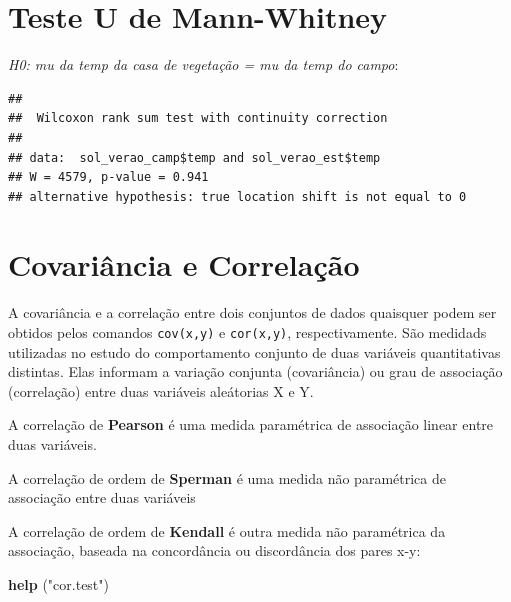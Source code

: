 \documentclass[
]{book}
\newenvironment{Shaded}{\begin{snugshade}}{\end{snugshade}}
\newcommand{\DataTypeTok}[1]{\textcolor[rgb]{0.13,0.29,0.53}{#1}}
\newcommand{\KeywordTok}[1]{\textcolor[rgb]{0.13,0.29,0.53}{\textbf{#1}}}
\newcommand{\NormalTok}[1]{#1}
\newcommand{\OperatorTok}[1]{\textcolor[rgb]{0.81,0.36,0.00}{\textbf{#1}}}
\newcommand{\StringTok}[1]{\textcolor[rgb]{0.31,0.60,0.02}{#1}}
\begin{document}
\hypertarget{teste-u-de-mann-whitney}{%
\section{Teste U de Mann-Whitney}\label{teste-u-de-mann-whitney}}

\emph{H0: mu da temp da casa de vegetação = mu da temp do campo}:

\begin{Shaded}
\end{Shaded}

\begin{verbatim}
## 
##  Wilcoxon rank sum test with continuity correction
## 
## data:  sol_verao_camp$temp and sol_verao_est$temp
## W = 4579, p-value = 0.941
## alternative hypothesis: true location shift is not equal to 0
\end{verbatim}

\hypertarget{covariuxe2ncia-e-correlauxe7uxe3o}{%
\section{Covariância e Correlação}\label{covariuxe2ncia-e-correlauxe7uxe3o}}

A covariância e a correlação entre dois conjuntos de dados quaisquer podem ser obtidos pelos comandos \texttt{cov(x,y)} e \texttt{cor(x,y)}, respectivamente.
São medidads utilizadas no estudo do comportamento conjunto de duas variáveis quantitativas distintas. Elas informam a variação conjunta (covariância) ou grau de associação (correlação) entre duas variáveis aleátorias X e Y.

A correlação de \textbf{Pearson} é uma medida paramétrica de associação linear entre duas variáveis.

A correlação de ordem de \textbf{Sperman} é uma medida não paramétrica de associação entre duas variáveis

A correlação de ordem de \textbf{Kendall} é outra medida não paramétrica da associação, baseada na concordância ou discordância dos pares x-y:

\begin{Shaded}
\begin{Highlighting}[]
\KeywordTok{help}\NormalTok{ (}\StringTok{"cor.test"}\NormalTok{)}
\end{Highlighting}
\end{Shaded}
\end{document}
